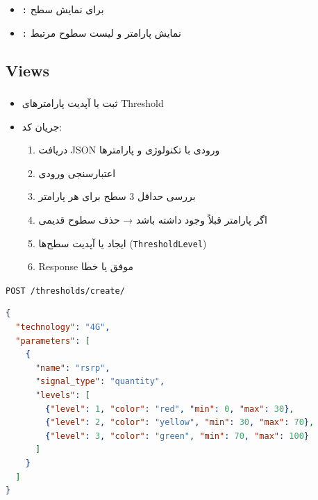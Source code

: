 \documentclass{report}
\begin{document}
\subsubsection{}
\begin{itemize}
    \item \texttt{:} برای نمایش سطح
    \item \texttt{:} نمایش پارامتر و لیست سطوح مرتبط
\end{itemize}

\subsection{Views}

\subsubsection{}
\begin{itemize}
    \item ثبت یا آپدیت پارامترهای Threshold
    \item جریان کد:
    \begin{enumerate}
        \item دریافت JSON ورودی با تکنولوژی و پارامترها
        \item اعتبارسنجی ورودی
        \item بررسی حداقل 3 سطح برای هر پارامتر
        \item اگر پارامتر قبلاً وجود داشته باشد → حذف سطوح قدیمی
        \item ایجاد یا آپدیت سطح‌ها (\texttt{ThresholdLevel})
        \item Response موفق  یا خطا 
    \end{enumerate}
\end{itemize}

\begin{center}
	\begin{latin}
		\texttt{POST \hspace{1cm}  /thresholds/create/}
	\end{latin}
\end{center}

\begin{lstlisting}[language=json]
{
  "technology": "4G",
  "parameters": [
    {
      "name": "rsrp",
      "signal_type": "quantity",
      "levels": [
        {"level": 1, "color": "red", "min": 0, "max": 30},
        {"level": 2, "color": "yellow", "min": 30, "max": 70},
        {"level": 3, "color": "green", "min": 70, "max": 100}
      ]
    }
  ]
}
\end{lstlisting}
\end{document}
